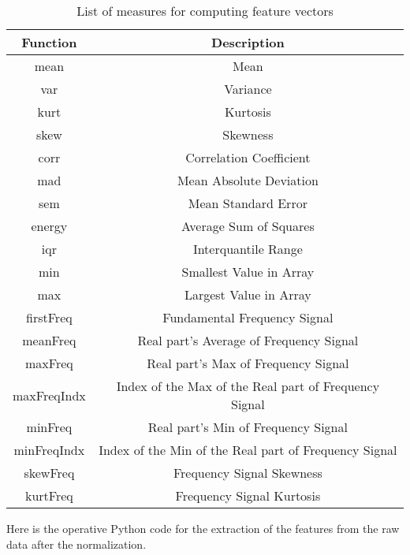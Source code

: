 \begin{table}[H]
    \centering
    \begin{tabular}{||c||c||}
        \hline
        \textbf{Function} & \textbf{Description} \\
        \hline
        mean & Mean \\
        var & Variance \\
        kurt & Kurtosis \\
        skew & Skewness \\
        corr & Correlation Coefficient \\
        mad & Mean Absolute Deviation \\
        sem & Mean Standard Error \\
        energy & Average Sum of Squares \\
        iqr & Interquantile Range \\
        min & Smallest Value in Array \\
        max & Largest Value in Array \\
        firstFreq & Fundamental Frequency Signal \\
        meanFreq & Real part's Average of Frequency Signal \\
        maxFreq & Real part's Max of Frequency Signal \\
        maxFreqIndx & Index of the Max of the Real part of Frequency Signal \\ 
        minFreq & Real part's Min of Frequency Signal \\
        minFreqIndx & Index of the Min of the Real part of Frequency Signal \\ 
        skewFreq & Frequency Signal Skewness \\
        kurtFreq & Frequency Signal Kurtosis \\
        \hline
    \end{tabular}
    \caption{List of measures for computing feature vectors}
\label{tab:ml_features}
\end{table}

Here is the operative Python code for the extraction of the features from the raw data after the normalization.
\clearpage 
{}


